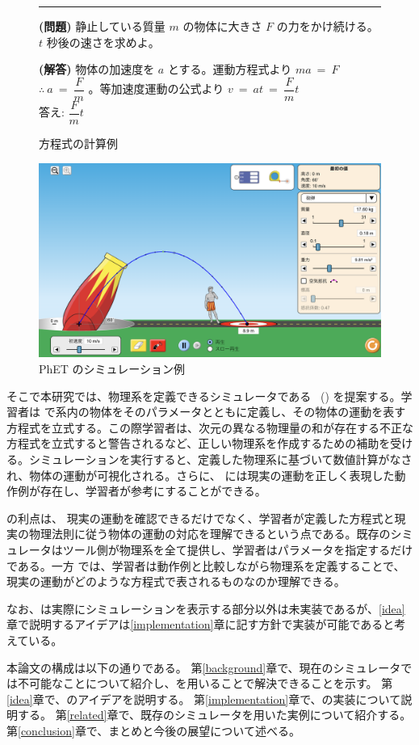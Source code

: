 \begin{figure}[htb]
\noindent\rule{\linewidth}{0.4pt}

\small{\textbf{(問題)} 静止している質量 $m$ の物体に大きさ $F$ の力をかけ続ける。$t$ 秒後の速さを求めよ。}

\small{\textbf{(解答)} 物体の加速度を $a$ とする。運動方程式より $ma~=~F$ $\therefore~a~=~\dfrac{F}{m}$ 。等加速度運動の公式より $v~=~at~=~\dfrac{F}{m}t$\\
答え: $\dfrac{F}{m}t$}

\caption{方程式の計算例} \label{symbol_based}
\end{figure}

\begin{figure}[htb]
\centering
\includegraphics*[width=0.9\linewidth]{figure/PhET_example.png}
\caption{PhET のシミュレーション例} \label{numeral_based}
\end{figure}

そこで本研究では、物理系を定義できるシミュレータである \simname~(\simnamealt) を提案する。学習者は \simname で系内の物体をそのパラメータとともに定義し、その物体の運動を表す方程式を立式する。この際学習者は、次元の異なる物理量の和が存在する不正な方程式を立式すると警告されるなど、正しい物理系を作成するための補助を受ける。シミュレーションを実行すると、定義した物理系に基づいて数値計算がなされ、物体の運動が可視化される。さらに、 \simname には現実の運動を正しく表現した動作例が存在し、学習者が参考にすることができる。

\simname の利点は、
現実の運動を確認できるだけでなく、学習者が定義した方程式と現実の物理法則に従う物体の運動の対応を理解できるという点である。既存のシミュレータはツール側が物理系を全て提供し、学習者はパラメータを指定するだけである。一方 \simname では、学習者は動作例と比較しながら物理系を定義することで、現実の運動がどのような方程式で表されるものなのか理解できる。

なお、\simname は実際にシミュレーションを表示する部分以外は未実装であるが、\ref{idea}章で説明するアイデアは\ref{implementation}章に記す方針で実装が可能であると考えている。

本論文の構成は以下の通りである。
第\ref{background}章で、現在のシミュレータでは不可能なことについて紹介し、\simname を用いることで解決できることを示す。
第\ref{idea}章で、\simname のアイデアを説明する。
第\ref{implementation}章で、\simname の実装について説明する。
第\ref{related}章で、既存のシミュレータを用いた実例について紹介する。
第\ref{conclusion}章で、まとめと今後の展望について述べる。

